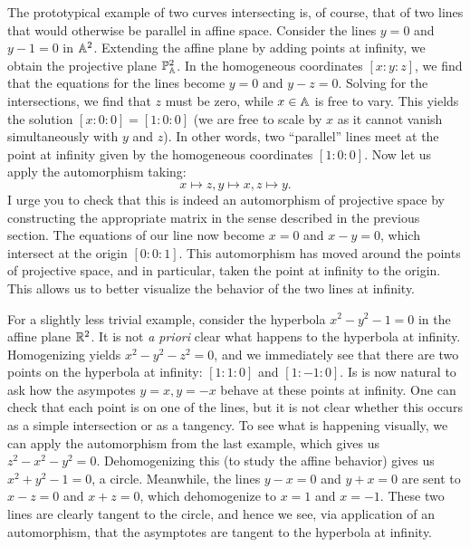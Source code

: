 \documentclass{../../mathnotes}
\begin{document}
\begin{exmp}
    The prototypical example of two curves intersecting is, of course, that of two lines that would otherwise be parallel in
    affine space. Consider the lines $y=0$ and $y-1=0$ in $\mathbb{A}^2$. Extending the affine plane by adding points at
    infinity, we obtain the projective plane $\mathbb{P}_{\mathbb{A}}^2$. In the homogeneous coordinates $[x:y:z]$, we find that
    the equations for the lines become $y=0$ and $y-z=0$. Solving for the intersections, we find that $z$ must be zero, while $x\in\mathbb{A}$ is free to vary.
    This yields the solution $[x:0:0]=[1:0:0]$ (we are free to scale by $x$ as it cannot vanish simultaneously with
    $y$ and $z$). In other words, two ``parallel'' lines meet at the point at infinity given by the homogeneous
    coordinates $[1:0:0]$. Now let us apply the automorphism taking:
    \[x\mapsto z,y\mapsto x,z\mapsto y.\]
    I urge you to check that this is indeed an automorphism of projective space by constructing the appropriate
    matrix in the sense described in the previous section. The equations of our line now become
    $x=0$ and $x-y=0$, which intersect at the origin $[0:0:1]$. This automorphism has 
    moved around the points of projective space, and in particular, taken the point at infinity to the origin.
    This allows us to better visualize the behavior of the two lines at infinity.
\end{exmp}

\begin{exmp}
     For a slightly less trivial example, consider the hyperbola $x^2-y^2-1=0$ in the affine plane $\mathbb{R}^2$. It is
    not \textit{a priori} clear what happens to the hyperbola at infinity. Homogenizing yields $x^2-y^2-z^2=0$,
    and we immediately see that there are two points on the hyperbola at infinity: $[1:1:0]$ and $[1:-1:0]$.
    Is is now natural to ask how the asympotes $y=x,y=-x$ behave at these points at infinity. One can check that
    each point is on one of the lines, but it is not clear whether this occurs as a simple intersection or as a
    tangency. To see what is happening visually, we can apply the automorphism from the last example, which gives
    us $z^2-x^2-y^2=0$. Dehomogenizing this (to study the affine behavior) gives us $x^2+y^2-1=0$, a circle.
    Meanwhile, the lines $y-x=0$ and $y+x=0$ are sent to $x-z=0$ and $x+z=0$, which dehomogenize to
    $x=1$ and $x=-1$. These two lines are clearly tangent to the circle, and hence we see, via application of an
    automorphism, that the asymptotes are tangent to the hyperbola at infinity.
\end{exmp}
\end{document}
